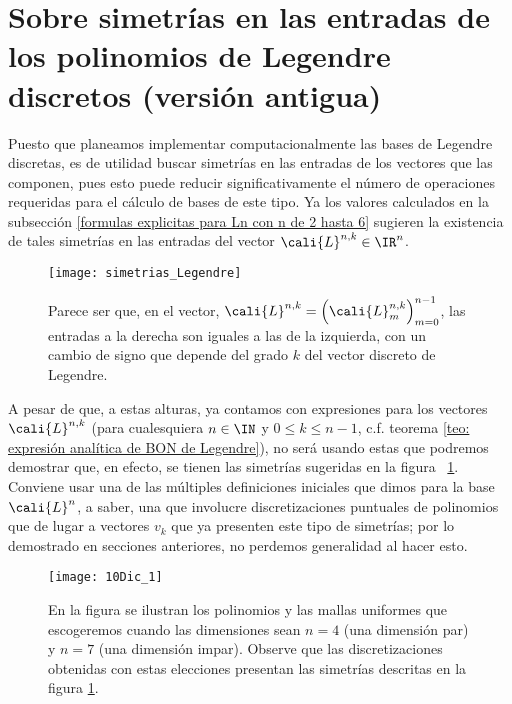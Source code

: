 \section{Sobre simetrías en las entradas de los polinomios de Legendre discretos (versión antigua)}
\label{section: sobre simetrias en las entradas de los poliomios discretos de Legendre (versión antigua)}

Puesto que planeamos implementar computacionalmente
las bases de Legendre discretas, es de utilidad 
buscar simetrías en las entradas de los vectores que las 
componen, pues esto puede reducir significativamente
el número de operaciones requeridas para el cálculo 
de bases de este tipo.
Ya los valores calculados
en la subsección 
\ref{formulas explicitas para Ln con n de 2 hasta 6}
sugieren 
la existencia de tales simetrías en las entradas 
del vector $\cali{L}^{n,k} \in \IR^{n}$.


\begin{figure}[H] \label{fig: simetrias entradas Legendre}
\centering\captionsetup{format = hang}
	\begin{measuredfigure}
		\texttt{[image: simetrias\_Legendre]} 
		\caption{Parece ser que, en el vector,
		 $\cali{L}^{n,k} = \left( \cali{L}^{n,k}_{m} \right)_{m=0}^{n-1}$,
		las entradas a la derecha son iguales a las de la izquierda,
		con un cambio de signo que depende del
		grado $k$ del vector discreto de Legendre.}
		\label{fig: simetrias entradas Legendre}
 	\end{measuredfigure} 
 \end{figure}

A pesar de que, a estas alturas, ya contamos
con expresiones para los vectores $\cali{L}^{n,k}$
(para cualesquiera $n \in \IN$ y $0 \leq k \leq n-1$,
c.f. teorema \ref{teo: expresión analítica de BON de Legendre}),
no será usando estas que podremos demostrar que, en efecto,
se tienen las simetrías sugeridas en la figura
~\ref{fig: simetrias entradas Legendre}.
Conviene
usar una de las múltiples definiciones iniciales
que dimos para la base $\cali{L}^{n}$, a saber, una
que involucre discretizaciones puntuales de polinomios 
que de lugar a vectores $v_{k}$ que ya presenten 
este tipo de simetrías; por lo demostrado en secciones anteriores,
no perdemos generalidad al hacer esto. 


\begin{figure}[H]
\centering\captionsetup{format = hang}
	\begin{measuredfigure}
		\texttt{[image: 10Dic\_1]} 
		\caption{En la figura se ilustran los polinomios y las
		mallas uniformes que escogeremos cuando las dimensiones sean
		$n=4$ (una dimensión par) y $n=7$ (una dimensión impar). Observe que
		las discretizaciones obtenidas con estas elecciones presentan
		las simetrías descritas en la figura 
		\ref{fig: simetrias entradas Legendre}.}
 	\end{measuredfigure}
 \end{figure}


